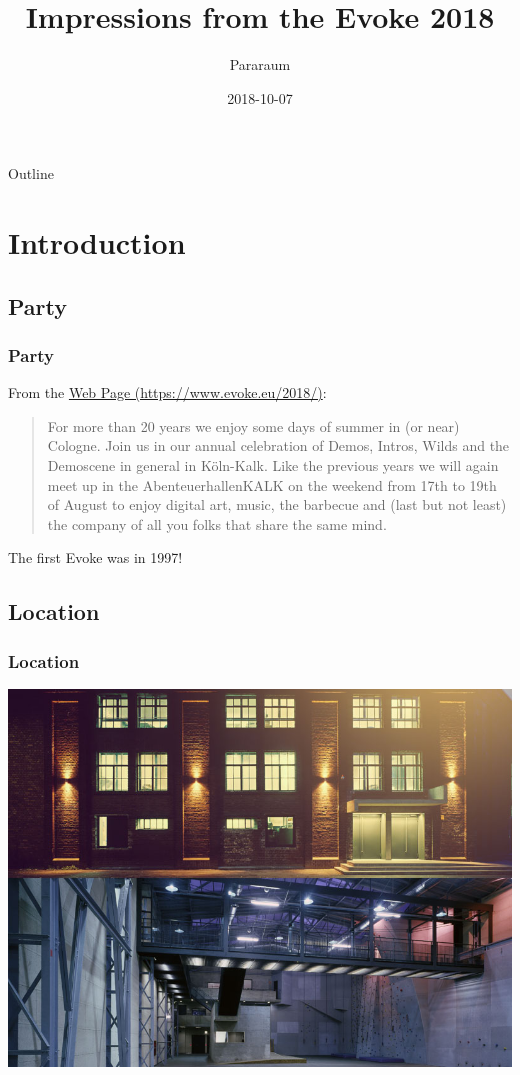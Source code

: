 \documentclass{beamer}
\title[Evoke 2018] 
{%
  Impressions from the Evoke 2018%
}
\author{Pararaum}
\date{2018-10-07}
\begin{document}
\begin{frame}
  \titlepage
\end{frame}

\begin{frame}{Outline}
  \tableofcontents
\end{frame}

\section{Introduction}

\subsection{Party}

\begin{frame}
  \frametitle{Party}

From the \href{http://evoke.eu}{Web Page (https://www.evoke.eu/2018/)}: 
\begin{quotation}
  For more than 20 years we enjoy some days of summer in (or near)
  Cologne. Join us in our annual celebration of Demos, Intros, Wilds
  and the Demoscene in general in Köln-Kalk. Like the previous years
  we will again meet up in the AbenteuerhallenKALK on the weekend from
  17th to 19th of August to enjoy digital art, music, the barbecue and
  (last but not least) the company of all you folks that share the
  same mind.
\end{quotation}

The first Evoke was in 1997!  
\end{frame}


\subsection{Location}
\begin{frame}
  \frametitle{Location}
  \includegraphics[width=\textwidth]{location}
\end{frame}
\end{document}
